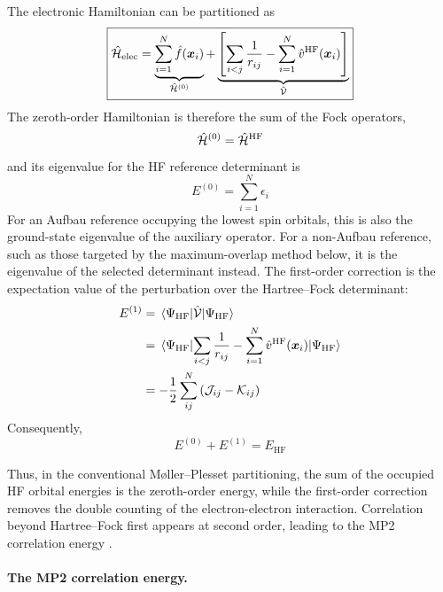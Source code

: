\documentclass[11pt,a4paper,titlepage]{article}
\numberwithin{equation}{section}
\newcommand{\bx}{\boldsymbol{x}}
\newcommand{\hf}{\Hat{f}}
\newcommand{\chH}{\Hat{\mathcal{H}}}
\newcommand{\chV}{\Hat{\mathcal{V}}}
\newcommand{\cJ}{\mathcal{J}}
\newcommand{\cK}{\mathcal{K}}
\begin{document}
\hfBioMollerPlesset

The electronic Hamiltonian can be partitioned as
\begin{equation}
  \boxed{
  \chH_\text{elec}
  =
  \underbrace{
    \sum_{i=1}^{N}\hf(\bx_i)
  }_{\chH^{(0)}}
  +
  \underbrace{
    \qty[
      \sum_{i<j}\frac{1}{r_{ij}}
      -
      \sum_{i=1}^{N}
      \Hat{v}^\text{HF}(\bx_i)
    ]
  }_{\chV}
  }
  \label{eq:mp-partition}
\end{equation}
The zeroth-order Hamiltonian is therefore the sum of the Fock operators,
\begin{equation}
  \chH^{(0)}
  =
  \chH^\text{HF}
\end{equation}
and its eigenvalue for the HF reference determinant is
\begin{equation}
  E^{(0)}
  =
  \sum_{i=1}^{N}\epsilon_i
\end{equation}
For an Aufbau reference occupying the lowest spin orbitals, this is also the
ground-state eigenvalue of the auxiliary operator. For a non-Aufbau
reference, such as those targeted by the maximum-overlap method below, it
is the eigenvalue of the selected determinant instead.
The first-order correction is the expectation value of the perturbation over
the Hartree--Fock determinant:
\begin{equation}
\begin{split}
  E^{(1)}
  &=
  \mel{\Psi_\text{HF}}
      {\chV}
      {\Psi_\text{HF}}
  \\
  &=
  \mel{\Psi_\text{HF}}
  {
    \sum_{i<j}\frac{1}{r_{ij}}
    -
    \sum_{i=1}^{N}
    \Hat{v}^\text{HF}(\bx_i)
  }
  {\Psi_\text{HF}}
  \\
  &=
  -\frac{1}{2}
  \sum_{ij}^{N}
  \qty(
    \cJ_{ij}-\cK_{ij}
  )
\end{split}
\end{equation}
Consequently,
\begin{equation}
  E^{(0)}+E^{(1)}
  =
  E_\text{HF}
\end{equation}

Thus, in the conventional M{\o}ller--Plesset partitioning, the sum of the
occupied HF orbital energies is the zeroth-order energy, while the
first-order correction removes the double counting of the electron-electron
interaction. Correlation beyond Hartree--Fock first appears at second order,
leading to the MP2 correlation energy \citep{Cremer2011}.

\paragraph{The MP2 correlation energy.}
\end{document}
